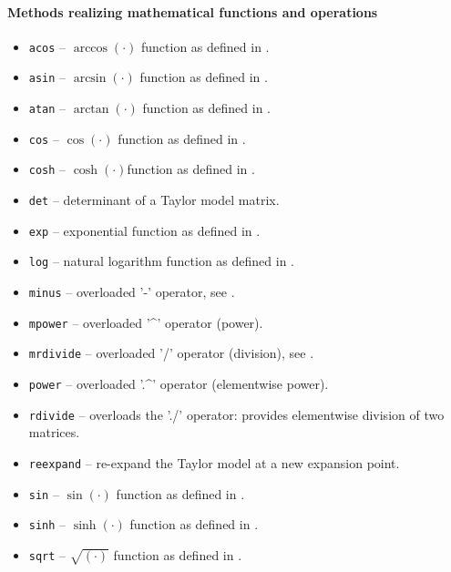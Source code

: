 \paragraph{Methods realizing mathematical functions and operations}
\begin{itemize}
    \item \texttt{acos} -- $\arccos(\cdot)$ function as defined in \cite[Eq.~(31)]{Althoff2018b}.
    \item \texttt{asin} -- $\arcsin(\cdot)$ function as defined in \cite[Eq.~(30)]{Althoff2018b}.
    \item \texttt{atan} -- $\arctan(\cdot)$ function as defined in \cite[Eq.~(32)]{Althoff2018b}.
    \item \texttt{cos} -- $\cos(\cdot)$ function as defined in \cite[Eq.~(25)]{Althoff2018b}.
    \item \texttt{cosh} -- $\cosh(\cdot)$function as defined in \cite[Eq.~(28)]{Althoff2018b}.
    \item \texttt{det} -- determinant of a Taylor model matrix.
    \item \texttt{exp} -- exponential function as defined in \cite[Eq.~(21)]{Althoff2018b}.
    \item \texttt{log} -- natural logarithm function as defined in \cite[Eq.~(22)]{Althoff2018b}.
    \item \texttt{minus} -- overloaded '-' operator, see \cite[Eq.~(7)]{Althoff2018b}.
    \item \texttt{mpower} -- overloaded '\string^' operator (power).
    \item \texttt{mrdivide} -- overloaded '/' operator (division), see \cite[Eq.~(9)]{Althoff2018b}.
    \item \texttt{power} -- overloaded '.\string^' operator (elementwise power).
    \item \texttt{rdivide} -- overloads the './' operator: provides elementwise division of two matrices.
    \item \texttt{reexpand} -- re-expand the Taylor model at a new expansion point.
    \item \texttt{sin} -- $\sin(\cdot)$ function as defined in \cite[Eq.~(24)]{Althoff2018b}.
    \item \texttt{sinh} -- $\sinh(\cdot)$ function as defined in \cite[Eq.~(27)]{Althoff2018b}.
    \item \texttt{sqrt} -- $\sqrt{(\cdot)}$ function as defined in \cite[Eq.~(23)]{Althoff2018b}.

\end{itemize}
